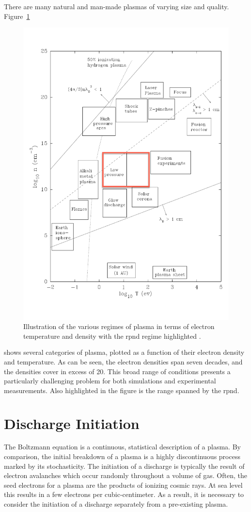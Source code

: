 There are many natural and man-made plasmas of varying size and quality.
Figure~\ref{fig:regimes}
\begin{figure}
  \centering
  \includegraphics{./chapters/theory/figures/regimes.pdf}
  \caption{Illustration of the various regimes of plasma in terms of
    electron temperature and density with the \acs{rpnd} regime highlighted
    \cite{Huba2011}.}
  \label{fig:regimes}
\end{figure}
shows several categories of plasma, plotted as a function of their electron
density and temperature. As can be seen, the electron densities span seven
decades, and the densities cover in excess of 20. This broad range of conditions
presents a particularly challenging problem for both simulations and
experimental measurements. Also highlighted in the figure is the range spanned
by the \acs{rpnd}.

\section{Discharge Initiation}
The Boltzmann equation is a continuous, statistical description of a plasma. By
comparison, the initial breakdown of a plasma is a highly discontinuous process
marked by its stochasticity. The initiation of a discharge is typically the
result of electron avalanches which occur randomly throughout a volume of gas.
Often, the seed electrons for a plasma are the products of ionizing cosmic rays.
At sea level this results in a few electrons per cubic-centimeter. As a result,
it is necessary to consider the initiation of a discharge separately from a
pre-existing plasma.


